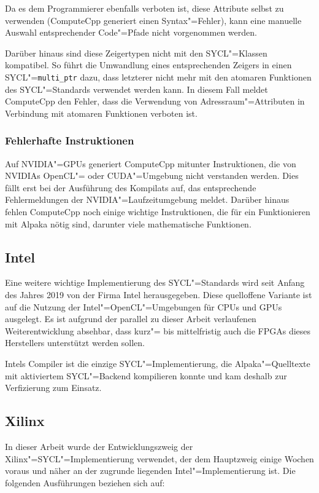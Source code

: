 Da es dem Programmierer ebenfalls verboten ist, diese Attribute selbst zu
verwenden (ComputeCpp generiert einen Syntax"=Fehler), kann eine manuelle
Auswahl entsprechender Code"=Pfade nicht vorgenommen werden.

Darüber hinaus sind diese Zeigertypen nicht mit den SYCL"=Klassen kompatibel.
So führt die Umwandlung eines entsprechenden Zeigers in einen
SYCL"=\texttt{multi\_ptr} dazu, dass letzterer nicht mehr mit den atomaren
Funktionen des SYCL"=Standards verwendet werden kann. In diesem Fall meldet
ComputeCpp den Fehler, dass die Verwendung von Adressraum"=Attributen in
Verbindung mit atomaren Funktionen verboten ist.

\subsubsection{Fehlerhafte Instruktionen}

Auf NVIDIA"=GPUs generiert ComputeCpp mitunter Instruktionen, die von NVIDIAs
OpenCL"= oder CUDA"=Umgebung nicht verstanden werden. Dies fällt erst bei der
Ausführung des Kompilats auf, das entsprechende Fehlermeldungen der
NVIDIA"=Laufzeitumgebung meldet. Darüber hinaus fehlen ComputeCpp noch einige
wichtige Instruktionen, die für ein Funktionieren mit Alpaka nötig sind,
darunter viele mathematische Funktionen.

\subsection{Intel}

Eine weitere wichtige Implementierung des SYCL"=Standards wird seit Anfang des
Jahres 2019 von der Firma Intel herausgegeben. Diese quelloffene Variante ist
auf die Nutzung der Intel"=OpenCL"=Umgebungen für CPUs und GPUs ausgelegt. Es
ist aufgrund der parallel zu dieser Arbeit verlaufenen Weiterentwicklung
absehbar, dass kurz"= bis mittelfristig auch die FPGAs dieses Herstellers
unterstützt werden sollen.

Intels Compiler ist die einzige SYCL"=Implementierung, die Alpaka"=Quelltexte
mit aktiviertem SYCL"=Backend kompilieren konnte und kam deshalb zur
Verfizierung zum Einsatz.

\subsection{Xilinx}
\label{ergebnisse:nutzbarkeit:xilinx}

In dieser Arbeit wurde der Entwicklungszweig der Xilinx"=SYCL"=Implementierung
verwendet, der dem Hauptzweig einige Wochen voraus und näher an der zugrunde
liegenden Intel"=Implementierung ist. Die folgenden Ausführungen beziehen sich
auf:

